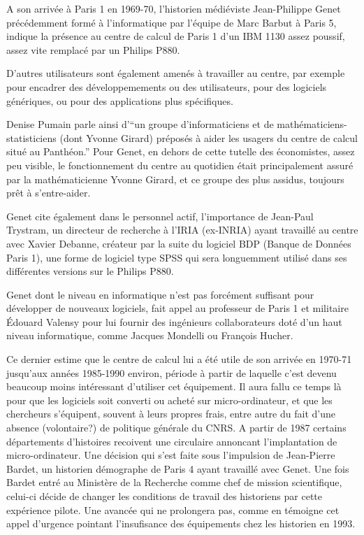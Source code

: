A son arrivée à Paris 1 en 1969-70, l'historien médiéviste Jean-Philippe Genet précédemment formé à l'informatique par l'équipe de Marc Barbut à Paris 5, indique la présence au centre de calcul de Paris 1 d'un IBM 1130 assez poussif, assez vite remplacé par un Philips P880.

D'autres utilisateurs sont également amenés à travailler au centre, par exemple pour encadrer des développemements ou des utilisateurs, pour des logiciels génériques, ou pour des applications plus spécifiques. 

Denise Pumain parle ainsi d'\enquote{un groupe d'informaticiens et de mathématiciens-statisticiens (dont Yvonne Girard) préposés à aider les usagers du centre de calcul situé au Panthéon.} Pour Genet, en dehors de cette tutelle des économistes, assez peu visible, le fonctionnement du centre au quotidien était principalement assuré par la mathématicienne Yvonne Girard, et ce groupe des plus assidus, toujours prêt à s'entre-aider.

Genet cite également dans le personnel actif, l'importance de Jean-Paul Trystram, un directeur de recherche à l'IRIA (ex-INRIA) ayant travaillé au centre avec Xavier Debanne, créateur par la suite du logiciel BDP (Banque de Données Paris 1), une forme de logiciel type SPSS qui sera longuemment utilisé dans ses différentes versions sur le Philips P880.

Genet dont le niveau en informatique n'est pas forcément suffisant pour développer de nouveaux logiciels, fait appel au professeur de Paris 1 et militaire Édouard Valensy pour lui fournir des ingénieurs collaborateurs doté d'un haut niveau informatique, comme Jacques Mondelli ou François Hucher.   

Ce dernier estime que le centre de calcul lui a été utile de son arrivée en 1970-71 jusqu'aux années 1985-1990 environ, période à partir de laquelle c'est devenu beaucoup moins intéressant d'utiliser cet équipement. Il aura fallu ce temps là pour que les logiciels soit converti ou acheté sur micro-ordinateur, et que les chercheurs s'équipent, souvent à leurs propres frais, entre autre du fait d'une absence (volontaire?) de politique générale du CNRS. A partir de 1987 certains départements d'histoires recoivent une circulaire annoncant l'implantation de micro-ordinateur. Une décision qui s'est faite sous l'impulsion de Jean-Pierre Bardet, un historien démographe de Paris 4 ayant travaillé avec Genet. Une fois Bardet entré au Ministère de la Recherche comme chef de mission scientifique, celui-ci décide de changer les conditions de travail des historiens par cette expérience pilote. Une avancée qui ne prolongera pas, comme en témoigne cet appel d'urgence pointant l'insufisance des équipements chez les historien en 1993. %

